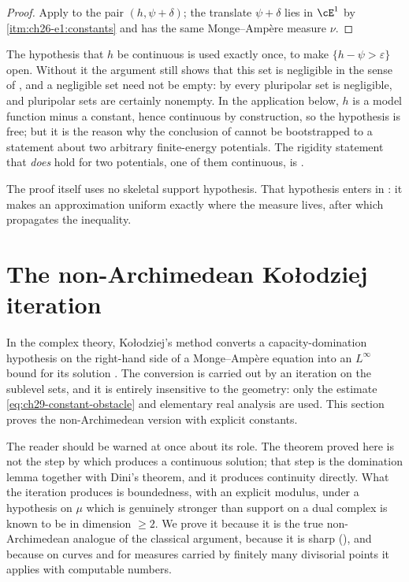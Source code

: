 \begin{proof}
Apply  to the pair \((h,\psi+\delta)\);
the translate \(\psi+\delta\) lies in \(\cE^1\) by
\,\cref{itm:ch26-e1:constants} and has the same
Monge--Amp\`ere measure \(\nu\).
\end{proof}

\begin{remark}
\label{rem:ch29-continuity-of-h}
The hypothesis that \(h\) be continuous is used exactly once, to make
\(\{h-\psi>\varepsilon\}\) open.  Without it the argument still shows that
this set is negligible in the sense of , and a
negligible set need not be empty: by
 every pluripolar set is negligible,
and pluripolar sets are certainly nonempty.  In the application below,
\(h\) is a model function minus a constant, hence continuous by
construction, so the hypothesis is free; but it is the reason why the
conclusion of  cannot be bootstrapped to
a statement about two arbitrary finite-energy potentials.  The rigidity
statement that \emph{does} hold for two potentials, one of them continuous,
is .
\end{remark}

The proof itself uses no skeletal support hypothesis.  That hypothesis
enters in : it makes an approximation uniform
exactly where the measure lives, after which
 propagates the inequality.

\section{The non-Archimedean Ko\l odziej iteration}
\label{sec:ch29-kolodziej}

In the complex theory, Ko\l odziej's method converts a capacity-domination
hypothesis on the right-hand side of a Monge--Amp\`ere equation into an
\(L^\infty\) bound for its solution \cite{Kol98,Kol05}.  The conversion is
carried out by an iteration on the sublevel sets, and it is entirely
insensitive to the geometry: only the estimate
\eqref{eq:ch29-constant-obstacle} and elementary real analysis are used.
This section proves the non-Archimedean version with explicit constants.

The reader should be warned at once about its role.  The theorem proved here
is not the step by which  produces a
continuous solution; that step is the domination lemma together with Dini's
theorem, and it produces continuity directly.  What the iteration produces
is boundedness, with an explicit modulus, under a hypothesis on \(\mu\)
which is genuinely stronger than support on a dual complex is known to be in
dimension \(\geq2\).  We prove it because it is the true non-Archimedean
analogue of the classical argument, because it is sharp
(), and because on curves and for measures carried
by finitely many divisorial points it applies with computable numbers.

